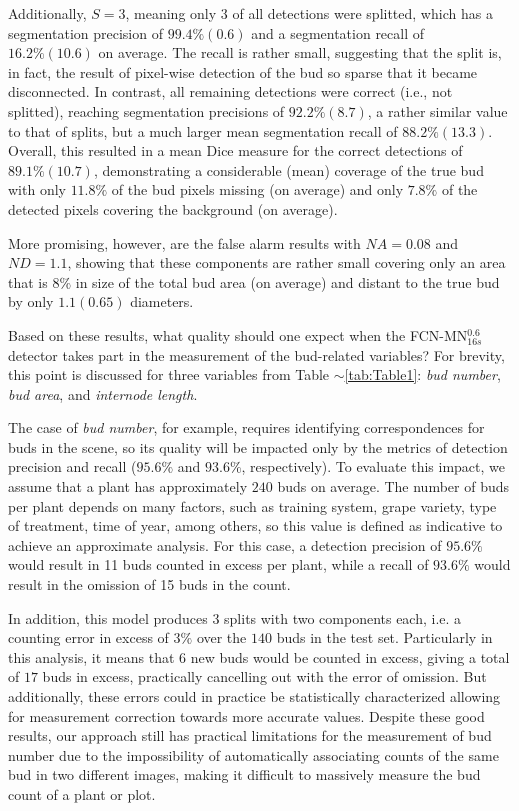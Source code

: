 \documentclass[a4paper,authoryear,review]{elsarticle}
\begin{document}
	Additionally, $S=3$, meaning only $3$ of all detections were splitted, which has a segmentation precision of $99.4\%(0.6)$ and a segmentation recall of $16.2\%(10.6)$ on average. The recall is rather small, suggesting that the split is, in fact, the result of pixel-wise detection of the bud so sparse that it became disconnected. In contrast, all remaining detections were correct (i.e., not splitted), reaching segmentation precisions of $92.2\%(8.7)$, a rather similar value to that of splits, but a much larger mean segmentation recall of $88.2\%(13.3)$. Overall, this resulted in a mean Dice measure for the correct detections of $89.1\%(10.7)$, demonstrating a considerable (mean) coverage of the true bud with only $11.8\%$ of the bud pixels missing (on average) and only $7.8\%$ of the detected pixels covering the background (on average).
	
	More promising, however, are the false alarm results with $NA=0.08$ and $ND=1.1$, showing that these components are rather small covering only an area that is $8\%$ in size of the total bud area (on average) and distant to the true bud by only $1.1 (0.65)$ diameters.
	
	Based on these results, what quality should one expect when the FCN-MN$_{16s}^{0.6}$ detector takes part in the measurement of the bud-related variables? For brevity, this point is discussed for three variables from Table $\sim$\ref{tab:Table1}: \emph{bud number}, \emph{bud area}, and \emph{internode length}.
	
	The case of \emph{bud number}, for example, requires identifying correspondences for buds in the scene, so its quality will be impacted only by the metrics of detection precision and recall ($95.6\%$ and $93.6\%$, respectively). To evaluate this impact, we assume that a plant has approximately $240$ buds on average. The number of buds per plant depends on many factors, such as training system, grape variety, type of treatment, time of year, among others, so this value is defined as indicative to achieve an approximate analysis. For this case, a detection precision of $95.6\%$ would result in 11 buds counted in excess per plant, while a recall of $93.6\%$ would result in the omission of 15 buds in the count. 
	
	In addition, this model produces 3 splits with two components each, i.e. a counting error in excess of $3\%$ over the $140$ buds in the test set. Particularly in this analysis, it means that $6$ new buds would be counted in excess, giving a total of $17$ buds in excess, practically cancelling out with the error of omission. But additionally, these errors could in practice be statistically characterized allowing for measurement correction towards more accurate values. Despite these good results, our approach still has practical limitations for the measurement of bud number due to the impossibility of automatically associating counts of the same bud in two different images, making it difficult to massively measure the bud count of a plant or plot. 
	
\end{document}
